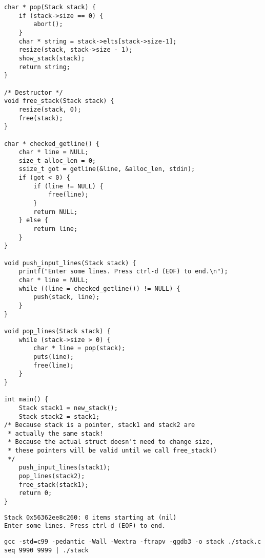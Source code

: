 \documentclass[11pt]{article}
\begin{document}
\begin{verbatim}
char * pop(Stack stack) {
    if (stack->size == 0) {
        abort();
    }
    char * string = stack->elts[stack->size-1];
    resize(stack, stack->size - 1);
    show_stack(stack);
    return string;
}

/* Destructor */
void free_stack(Stack stack) {
    resize(stack, 0);
    free(stack);
}

char * checked_getline() {
    char * line = NULL;
    size_t alloc_len = 0;
    ssize_t got = getline(&line, &alloc_len, stdin);
    if (got < 0) {
        if (line != NULL) {
            free(line);
        }
        return NULL;
    } else {
        return line;
    }
}

void push_input_lines(Stack stack) {
    printf("Enter some lines. Press ctrl-d (EOF) to end.\n");
    char * line = NULL;
    while ((line = checked_getline()) != NULL) {
        push(stack, line);
    }
}

void pop_lines(Stack stack) {
    while (stack->size > 0) {
        char * line = pop(stack);
        puts(line);
        free(line);
    }
}

int main() {
    Stack stack1 = new_stack();
    Stack stack2 = stack1;
/* Because stack is a pointer, stack1 and stack2 are 
 * actually the same stack!
 * Because the actual struct doesn't need to change size,
 * these pointers will be valid until we call free_stack()
 */
    push_input_lines(stack1);
    pop_lines(stack2);
    free_stack(stack1);
    return 0;
}
\end{verbatim}

\begin{verbatim}
Stack 0x56362ee8c260: 0 items starting at (nil)
Enter some lines. Press ctrl-d (EOF) to end.
\end{verbatim}

\begin{verbatim}
gcc -std=c99 -pedantic -Wall -Wextra -ftrapv -ggdb3 -o stack ./stack.c
seq 9990 9999 | ./stack
\end{verbatim}
\end{document}
